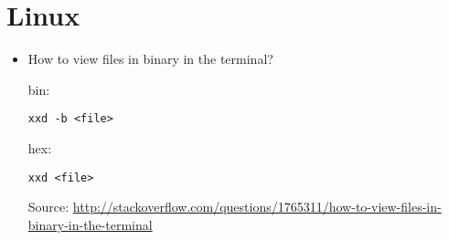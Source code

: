 \documentclass{article}
\begin{document}
\section{Linux}

\begin{itemize}
\item How to view files in binary in the terminal?

bin:
\begin{lstlisting}
xxd -b <file>
\end{lstlisting}

hex:
\begin{lstlisting}
xxd <file>
\end{lstlisting}

Source: \href{http://stackoverflow.com/questions/1765311/how-to-view-files-in-binary-in-the-terminal}{http://stackoverflow.com/questions/1765311/how-to-view-files-in-binary-in-the-terminal}

\end{itemize}
\end{document}
